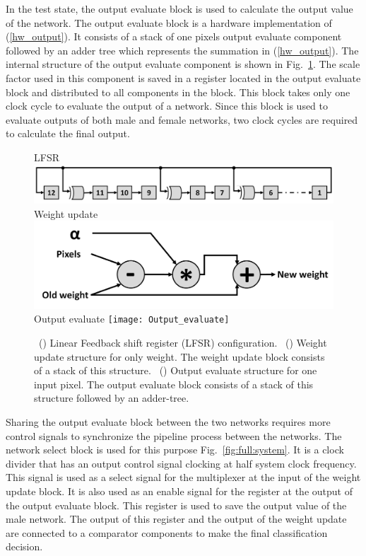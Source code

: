 \documentclass[10pt,journal]{IEEEtran}
\newcommand{\fig}[1]{Fig.~\ref{#1}}
\newcommand{\eq}[1]{(\ref{#1})}
\begin{document}
In the test state, the output evaluate block is used to calculate the output value of the network. The output evaluate block is a hardware implementation of  \eq{hw_output}. It consists of a stack of one pixels output evaluate component followed by an adder tree which represents the summation in \eq{hw_output}. The internal structure of the output evaluate component is shown in \fig{fig:output:evaluate}. The scale factor used in this component is saved in a register located in the output evaluate block and distributed to all components in the block. This block takes only one clock cycle to evaluate the output of a network. Since this block is used to evaluate outputs of both male and female networks, two clock cycles are required to calculate the final output. 


	\begin{figure}[h]
					\captionsetup[subfigure]{position=b}
					\centering
					\hfill
					\subcaptionbox
					{
						LFSR
						\label{fig:lfsr}
					}
					{\includegraphics[width=0.9\columnwidth]{LFSR}}
					\hfill
					\subcaptionbox
					{
						Weight update
						\label{fig:weight:update}
					}
					{\includegraphics[width=0.9\columnwidth]{Weight_update}}
					\hfill
					\subcaptionbox
					{
						Output evaluate
						\label{fig:output:evaluate}
					}
					{\texttt{[image: Output\_evaluate]}}
					\hfill
					\caption{~()  Linear Feedback shift register (LFSR) configuration. ~() Weight update structure for only weight. The weight update block consists of a stack of this structure.  ~() Output evaluate structure for one input pixel. The output evaluate block consists of a stack of this structure followed by an adder-tree.}
					\label{fig:output:evaluate}
				\end{figure}
				
				
Sharing the output evaluate block between the two networks requires more control signals to synchronize the pipeline process between the networks. The network select block is used for this purpose \fig{fig:full:system}. It is a clock divider that has an output control signal clocking at half system clock frequency. This signal is used as a select signal for the multiplexer at the input of the weight update block. It is also used as an enable signal for the register at the output of the output evaluate block. This register is used to save the output value of the male network. The output of this register and the output of the weight update are connected to a comparator components to make the final classification decision. 
	
\end{document}
